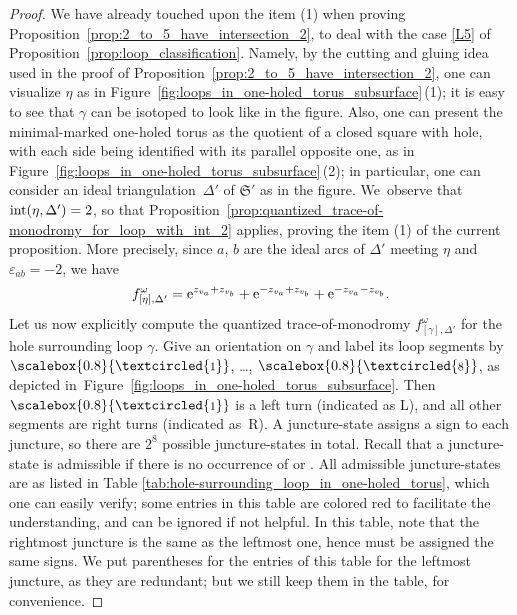 \documentclass[pdftex]{sigma}
\numberwithin{equation}{section}
\theoremstyle{definition}
\newcommand{\circled}[1]{\scalebox{0.8}{\textcircled{\fontsize{8}{9}\selectfont \raisebox{-0.1pt}{#1}}}}
\begin{document}
\begin{proof} We have already touched upon the item (1) when proving Proposition~\ref{prop:2_to_5_have_intersection_2}, to deal with the case \ref{L5} of {Proposition~\ref{prop:loop_classification}}. Namely, by the cutting and gluing idea used in the proof of Proposition~\ref{prop:2_to_5_have_intersection_2}, one can visualize $\eta$ as in Figure~\ref{fig:loops_in_one-holed_torus_subsurface}\,(1); it is easy to see that $\gamma$ can be isotoped to look like in the figure. Also, one can present the minimal-marked one-holed torus as the quotient of a closed square with hole, with each side being identified with its parallel opposite one, as in Figure~\ref{fig:loops_in_one-holed_torus_subsurface}\,(2); in particular, one can consider an ideal triangulation~$\Delta'$ of $\mathfrak{S}'$ as in the figure. We~observe that ${\rm int}(\eta,\Delta')=2$, so that Proposition~\ref{prop:quantized_trace-of-monodromy_for_loop_with_int_2} applies, proving the item (1) of the current proposition. More precisely, since $a$, $b$ are the ideal arcs of $\Delta'$ meeting $\eta$ and $\varepsilon_{ab}=-2$, we have
\begin{align}
\label{eq:oht_eta_f_omega}
f^\omega_{[\eta],\Delta'} = {\rm e}^{ z_{v_a} + z_{v_b} } + {\rm e}^{ - z_{v_a} + z_{v_b}} + {\rm e}^{-z_{v_a} - z_{v_b}}.
\end{align}
Let us now explicitly compute the quantized trace-of-monodromy $f^\omega_{[\gamma],\Delta'}$ for the hole surrounding loop $\gamma$. Give an orientation on $\gamma$ and label its loop segments by $\circled{1}$, \dots, $\circled{8}$, as depicted in~Figure~\ref{fig:loops_in_one-holed_torus_subsurface}. Then $\circled{1}$ is a left turn (indicated as L), and all other segments are right turns (indicated as~R). A juncture-state assigns a sign to each juncture, so there are $2^8$ possible juncture-states in total. Recall that a juncture-state is admissible if there is no occurrence of  or . All admissible juncture-states are as listed in Table \ref{tab:hole-surrounding_loop_in_one-holed_torus}, which one can easily verify; some entries in this table are colored red to facilitate the understanding, and can be ignored if not helpful. In this table, note that the rightmost juncture is the same as the leftmost one, hence must be assigned the same signs. We put parentheses for the entries of this table for the leftmost juncture, as they are redundant; but we still keep them in the table, for convenience.

\end{proof}
\end{document}
